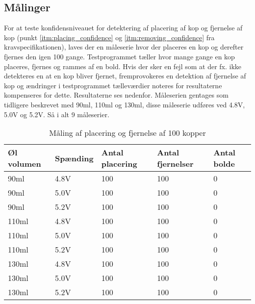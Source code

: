 \documentclass[Modultest/Modultest_main.tex]{subfiles}
\begin{document}
\subsection{Målinger}
For at teste konfidensniveauet for detektering af placering af kop og fjernelse af kop (punkt \ref{itm:placing_confidence} og \ref{itm:removing_confidence} fra kravspecifikationen), laves der en måleserie hvor der placeres en kop og derefter fjernes den igen 100 gange. Testprogrammet tæller hvor mange gange en kop placeres, fjernes og rammes af en bold. Hvis der sker en fejl som at der fx. ikke detekteres en at en kop bliver fjernet, fremprovokeres en detektion af fjernelse af kop og ændringer i testprogrammet tælleværdier noteres for resultaterne kompenseres for dette. Resultaterne ses nedenfor. Måleserien gentages som tidligere beskrevet med 90ml, 110ml og 130ml, disse måleserie udføres ved 4.8V, 5.0V og 5.2V. Så i alt 9 måleserier.
\begin{table}[H]
    \centering
    \begin{tabular}{|L{0.15\textwidth}|L{0.15\textwidth}|L{0.2\textwidth}|L{0.2\textwidth}|L{0.2\textwidth}|}
         \hline
         \textbf{Øl volumen} & \textbf{Spænding} & \textbf{Antal placering} & \textbf{Antal fjernelser} & \textbf{Antal bolde} \\ \hline
         90ml & 4.8V & 100 & 100 & 0 \\ \hline 
         90ml & 5.0V & 100 & 100 & 0 \\ \hline 
         90ml & 5.2V & 100 & 100 & 0\\ \hline
         110ml & 4.8V & 100 & 100 & 0 \\ \hline 
         110ml & 5.0V & 100 & 100 & 0 \\ \hline 
         110ml & 5.2V & 100 & 100 & 0 \\ \hline
         130ml & 4.8V & 100 & 100 & 0 \\ \hline 
         130ml & 5.0V & 100 & 100 & 0\\ \hline 
         130ml & 5.2V & 100 & 100 & 0 \\ \hline
    \end{tabular}
    \caption{Måling af placering og fjernelse af 100 kopper}
     \label{tab:100_placed_removed_cups}
\end{table}
\end{document}
